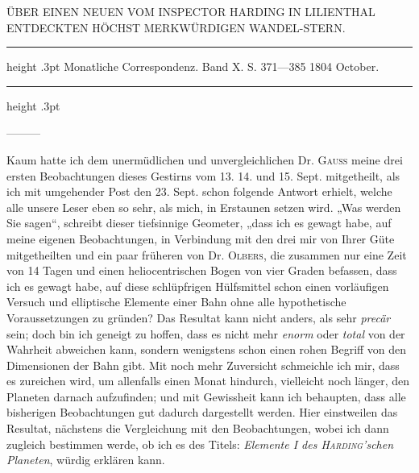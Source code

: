 \par\bigskip
{}
\hypertarget{native-255-lower}{}
\begin{center}
\normalsize ÜBER EINEN NEUEN VOM INSPECTOR HARDING IN LILIENTHAL ENTDECKTEN HÖCHST MERKWÜRDIGEN WANDEL-STERN.
\end{center}

\begin{center}
\parbox{.76\linewidth}{%
\centering\fontsize{8.2}{10.2}\selectfont
\hrule height .3pt\relax\vspace{2.5pt}
Monatliche Correspondenz. Band X. S. 371—385 1804 October.\par
\vspace{2.5pt}\hrule height .3pt\relax
}
\end{center}

\par\indent —\quad—\quad—\par
\par\indent Kaum hatte ich dem unermüdlichen und unvergleichlichen Dr. \textsc{Gauss} meine drei ersten
Beobachtungen dieses Gestirns vom 13. 14. und 15. Sept. mitgetheilt, als ich mit
umgehender Post den 23. Sept. schon folgende Antwort erhielt, welche alle unsere Leser
eben so sehr, als mich, in Erstaunen setzen wird. „Was werden Sie sagen“, schreibt
dieser tiefsinnige Geometer, „dass ich es gewagt habe, auf meine eigenen Beobachtungen,
in Verbindung mit den drei mir von Ihrer Güte mitgetheilten und ein paar früheren
von Dr. \textsc{Olbers}, die zusammen nur eine Zeit von 14 Tagen und einen heliocentrischen
Bogen von vier Graden befassen, dass ich es gewagt habe, auf diese schlüpfrigen
Hülfsmittel schon einen vorläufigen Versuch und elliptische Elemente einer Bahn ohne
alle hypothetische Voraussetzungen zu gründen? Das Resultat kann nicht anders, als
sehr \textit{precär} sein; doch bin ich geneigt zu hoffen, dass es nicht mehr
\textit{enorm} oder \textit{total} von der Wahrheit abweichen kann, sondern wenigstens
schon einen rohen Begriff von den Dimensionen der Bahn gibt. Mit noch mehr Zuversicht
schmeichle ich mir, dass es zureichen wird, um allenfalls einen Monat hindurch,
vielleicht noch länger, den Planeten darnach aufzufinden; und mit Gewissheit kann ich
behaupten, dass alle bisherigen Beobachtungen gut dadurch dargestellt werden. Hier
einstweilen das Resultat, nächstens die Vergleichung mit den Beobachtungen, wobei ich
dann zugleich bestimmen werde, ob ich es des Titels: \textit{Elemente I des
\textsc{Harding}'schen Planeten}, würdig erklären kann.

